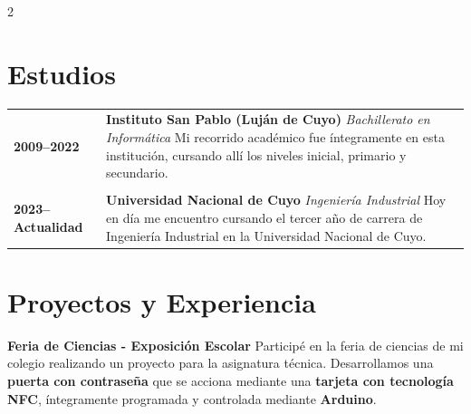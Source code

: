 \documentclass[lighthipster]{simplehipstercv}
\begin{document}
\begin{paracol}{2}
\vspace{2.5em}

\section*{Estudios}
\vspace{0.5em}
\begin{tabular}{@{} p{2.8cm} p{8cm} @{}}
    \bfseries 2009--2022 & 
    \textbf{Instituto San Pablo (Luján de Cuyo)} \newline
    \textsl{Bachillerato en Informática} \newline
    Mi recorrido académico fue íntegramente en esta institución, cursando allí los niveles inicial, primario y secundario. \\
    
    \multicolumn{2}{c}{\vspace{1em}} \\ %

    \bfseries 2023--Actualidad & 
    \textbf{Universidad Nacional de Cuyo} \newline
    \textsl{Ingeniería Industrial} \newline
    Hoy en día me encuentro cursando el tercer año de carrera de Ingeniería Industrial en la Universidad Nacional de Cuyo. \\
\end{tabular}

\vspace{2.5em}

\section*{Proyectos y Experiencia}
\vspace{0.5em}
\textbf{Feria de Ciencias - Exposición Escolar} \newline
Participé en la feria de ciencias de mi colegio realizando un proyecto para la asignatura técnica. Desarrollamos una \textbf{puerta con contraseña} que se acciona mediante una \textbf{tarjeta con tecnología NFC}, íntegramente programada y controlada mediante \textbf{Arduino}.

\end{paracol}
\end{document}
